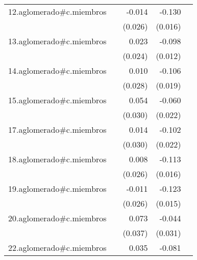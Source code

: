 {\begin{longtable}{l*{4}{D{.}{.}{-1}}}
\addlinespace
12.aglomerado#c.miembros&                     &      -0.014         &      -0.130\sym{***}&                     \\
            &                     &     (0.026)         &     (0.016)         &                     \\
\addlinespace
13.aglomerado#c.miembros&                     &       0.023         &      -0.098\sym{***}&                     \\
            &                     &     (0.024)         &     (0.012)         &                     \\
\addlinespace
14.aglomerado#c.miembros&                     &       0.010         &      -0.106\sym{***}&                     \\
            &                     &     (0.028)         &     (0.019)         &                     \\
\addlinespace
15.aglomerado#c.miembros&                     &       0.054         &      -0.060\sym{**} &                     \\
            &                     &     (0.030)         &     (0.022)         &                     \\
\addlinespace
17.aglomerado#c.miembros&                     &       0.014         &      -0.102\sym{***}&                     \\
            &                     &     (0.030)         &     (0.022)         &                     \\
\addlinespace
18.aglomerado#c.miembros&                     &       0.008         &      -0.113\sym{***}&                     \\
            &                     &     (0.026)         &     (0.016)         &                     \\
\addlinespace
19.aglomerado#c.miembros&                     &      -0.011         &      -0.123\sym{***}&                     \\
            &                     &     (0.026)         &     (0.015)         &                     \\
\addlinespace
20.aglomerado#c.miembros&                     &       0.073\sym{*}  &      -0.044         &                     \\
            &                     &     (0.037)         &     (0.031)         &                     \\
\addlinespace
22.aglomerado#c.miembros&                     &       0.035         &      -0.081\sym{***}&                     \\

\end{longtable}}
